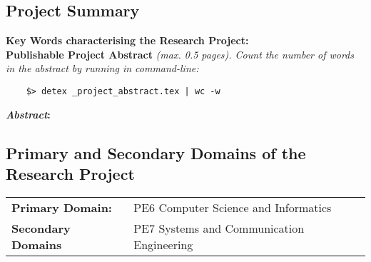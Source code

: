 \subsection{Project Summary}

\textbf{Key Words characterising the Research Project:}
\keywords
\\

\noindent
\textbf{Publishable Project Abstract}
\emph{(max. 0.5 pages).
Count the number of words in the abstract by running in command-line:
}
\begin{verbatim}
    $> detex _project_abstract.tex | wc -w
\end{verbatim}

\noindent\textbf{\emph{Abstract}:}


\subsection{Primary and Secondary Domains of the Research Project}

\begin{center}
    \small
    \begin{tabular}{|l|p{}|}
        \hline
        \textbf{Primary Domain:}   & PE6 Computer Science and Informatics\\
        \textbf{Secondary Domains} & PE7 Systems and Communication Engineering\\
        \hline
     \end{tabular}
\end{center}








% 
